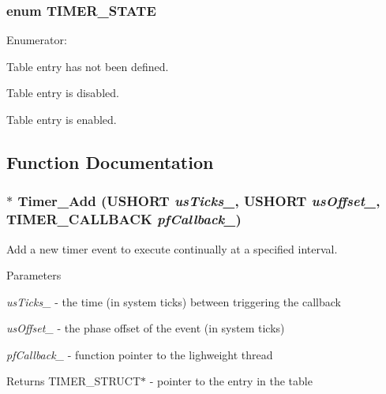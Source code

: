 \subsubsection[{TIMER\_\-STATE}]{\setlength{\rightskip}{0pt plus 5cm}enum {\bf TIMER\_\-STATE}}\label{timer_8h_a9dd7af1f06588d9bf57ee3d9e9f054cb}
\begin{Desc}
\item[Enumerator: ]\par
\begin{description}
\item[{\em 
TIMER\_\-STATE\_\-UNINIT\label{timer_8h_a9dd7af1f06588d9bf57ee3d9e9f054cbaf584cad4cf63e4510770a6e3bd6c3b9f}
}]Table entry has not been defined. \item[{\em 
TIMER\_\-STATE\_\-CLOSED\label{timer_8h_a9dd7af1f06588d9bf57ee3d9e9f054cba8dcef353ed18cbe4654824984a0efbe0}
}]Table entry is disabled. \item[{\em 
TIMER\_\-STATE\_\-OPEN\label{timer_8h_a9dd7af1f06588d9bf57ee3d9e9f054cba9c05f4abbe050cc6603e11ab93f08448}
}]Table entry is enabled. \end{description}
\end{Desc}



\subsection{Function Documentation}
\subsubsection[{Timer\_\-Add}]{$\ast$ Timer\_\-Add (USHORT {\em usTicks\_\-}, \/  USHORT {\em usOffset\_\-}, \/  {\bf TIMER\_\-CALLBACK} {\em pfCallback\_\-})}\label{timer_8h_a77341bb24e48fddc6dba39079e8959f8}
Add a new timer event to execute continually at a specified interval.


\begin{DoxyParams}{Parameters}
\item[{\em usTicks\_\-}]-\/ the time (in system ticks) between triggering the callback \item[{\em usOffset\_\-}]-\/ the phase offset of the event (in system ticks) \item[{\em pfCallback\_\-}]-\/ function pointer to the lighweight thread \end{DoxyParams}
\begin{DoxyReturn}{Returns}
TIMER\_\-STRUCT$\ast$ -\/ pointer to the entry in the table 
\end{DoxyReturn}
